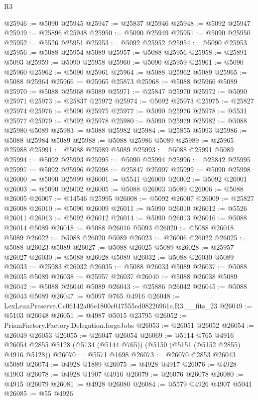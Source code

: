 \begin{lexlean}{R3}
\begin{coremodule}
@25946 := @5090 @25945
@25947 := @25837 @25946
@25948 := @5092 @25947
@25949 := @25896 @25948
@25950 := @5090 @25949
@25951 := @5090 @25950
@25952 := @5526 @25951
@25953 := @5092 @25952
@25954 := @5090 @25953
@25956 := @5088 @25954 @5089
@25957 := @5088 @25956
@25958 := @25891 @5093
@25959 := @5090 @25958
@25960 := @5090 @25959
@25961 := @5090 @25960
@25962 := @5090 @25961
@25964 := @5088 @25962 @5089
@25965 := @5088 @25964
@25966 := @25965 @25873
@25968 := @5088 @25966 @5089
@25970 := @5088 @25968 @5089
@25971 := @25847 @25970
@25972 := @5090 @25971
@25973 := @25837 @25972
@25974 := @5092 @25973
@25975 := @25827 @25974
@25976 := @5090 @25975
@25977 := @5090 @25976
@25978 := @5531 @25977
@25979 := @5092 @25978
@25980 := @5090 @25979
@25982 := @5088 @25980 @5089
@25983 := @5088 @25982
@25984 := @25855 @5093
@25986 := @5088 @25984 @5089
@25988 := @5088 @25986 @5089
@25989 := @25965 @25988
@25991 := @5088 @25989 @5089
@25993 := @5088 @25991 @5089
@25994 := @5092 @25993
@25995 := @5090 @25994
@25996 := @25842 @25995
@25997 := @5092 @25996
@25998 := @25847 @25997
@25999 := @5090 @25998
@26000 := @5090 @25999
@26001 := @5541 @26000
@26002 := @5092 @26001
@26003 := @5090 @26002
@26005 := @5088 @26003 @5089
@26006 := @5088 @26005
@26007 := @14546 @25995
@26008 := @5092 @26007
@26009 := @25827 @26008
@26010 := @5090 @26009
@26011 := @5090 @26010
@26012 := @5526 @26011
@26013 := @5092 @26012
@26014 := @5090 @26013
@26016 := @5088 @26014 @5089
@26018 := @5088 @26016 @5093
@26020 := @5088 @26018 @5089
@26022 := @5088 @26020 @5089
@26023 := @26006 @26022
@26025 := @5088 @26023 @5089
@26027 := @5088 @26025 @5089
@26028 := @25957 @26027
@26030 := @5088 @26028 @5089
@26032 := @5088 @26030 @5089
@26033 := @25983 @26032
@26035 := @5088 @26033 @5089
@26037 := @5088 @26035 @5089
@26038 := @25957 @26037
@26040 := @5088 @26038 @5089
@26042 := @5088 @26040 @5089
@26043 := @25886 @26042
@26045 := @5088 @26043 @5089
@26047 := @5097 @765 @4916
@26048 := LexLeanPreserve.Cc06142a06e1800c047555ed08226961e.R3.__fits_23
@26049 := @5103 @26048
@26051 := @4987 @5015 @23795
@26052 := PrismFactory.Factory.Delegation.forgeJobs
@26053 := @26051 @26052
@26054 := @26049 @26053
@26055 := @26047 @26054
@26069 := @5114
    @765
    @4916
    @26054
    @2855
    @5128
    (@5134 (@5144 @765))
    (@5150 (@5151 (@5152 @2855) @4916 @5128))
@26070 := @5571 @1698
@26073 := @26070 @2853 @26043 @5089
@26074 := @4928 @1889
@26075 := @4928 @4917
@26076 := @4928 @1903
@26078 := @4928 @1907 @4916
@26079 := @26076 @26078
@26080 := @4915 @26079
@26081 := @4928 @26080
@26084 := @5579 @4926 @4907 @5041
@26085 := @55 @4926

\end{coremodule}
\end{lexlean}
